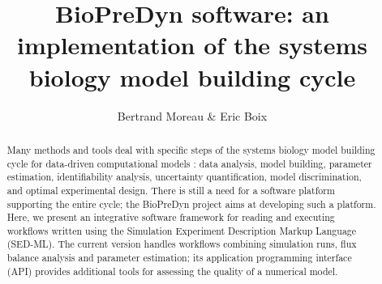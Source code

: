 \documentclass[17pt,portrait,a1,usenames,dvipsnames,plainboxedsections]{sciposter}
\begin{document}
\title{BioPreDyn software: an implementation of the systems biology model
building cycle}
\author{Bertrand Moreau \& Eric Boix}
\maketitle

\begin{abstract}
Many methods and tools deal with specific steps of
the systems biology model building cycle for data-driven computational models
\cite{Kitano2002}: data analysis, model building, parameter estimation,
identifiability analysis, uncertainty quantification, model discrimination, and
optimal experimental design. There is still a need for a software platform
supporting the entire cycle; the BioPreDyn project aims at developing such a
platform. Here, we present an integrative software framework for reading and
executing workflows written using the Simulation Experiment Description Markup
Language (SED-ML). The current version handles workflows combining simulation
runs, flux balance analysis and parameter estimation; its application
programming interface (API) provides additional tools for assessing the quality
of a numerical model.
\end{abstract}
\end{document}
